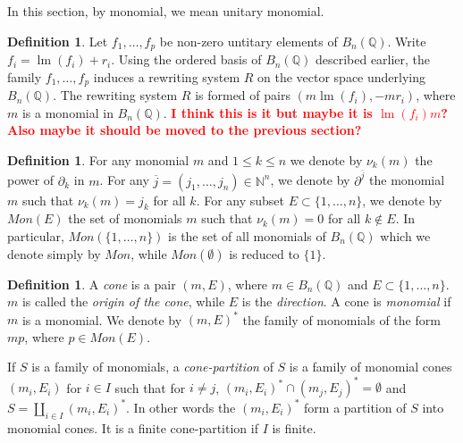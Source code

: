 \documentclass[10pt]{easychair}
\theoremstyle{definition}
\newtheorem{definition}[theorem]{Definition}
\newtheorem{example}[theorem]{Example}
\newcommand\todo[1]{{\bf\textcolor{red}{#1}}}
\DeclareMathOperator{\lm}{lm}
\newcommand\Q{\mathbb{Q}}
\newcommand\Weyl[1]{B_{#1}(\Q)}
\begin{document}
In this section, by monomial, we mean unitary monomial.



\begin{definition}
  Let $f_1,\ldots,f_p$ be non-zero untitary elements of $\Weyl n$.
  Write $f_i = \lm (f_i) + r_i$.
  Using the ordered basis of $\Weyl n$ described earlier,
  the family $f_1,\ldots,f_p$ induces a rewriting system $R$ on the vector
  space underlying $\Weyl n$.
  The rewriting system $R$ is formed of pairs $(m \lm(f_i), - m  r_i)$,
  where $m$ is a monomial in $\Weyl n$.
  \todo{I think this is it but maybe it is $\lm(f_i) m$?
    Also maybe it should be moved to the previous section?}
  
\end{definition}

\begin{definition}
  For any monomial $m$ and $1 \leq k \leq n$ we denote by $\nu_k(m)$
  the power of $\partial_k$ in $m$.
  For any $\overline j =(j_1,\ldots,j_n) \in \mathbb N^n$, we denote by $\partial^{\overline j}$
  the monomial $m$ such that $\nu_k(m) = j_k$ for all $k$. For any subset
  $E \subset \{1,\ldots,n\}$, we denote by $Mon(E)$ the set of monomials $m$ such that
  $\nu_k(m) = 0$ for all $k \notin E$. In particular, $Mon(\{1,\ldots,n\})$ is the set of
  all monomials of $\Weyl n$ which we denote simply by $Mon$, while $Mon(\emptyset)$ is
  reduced to $\{1\}$. 
\end{definition}

\begin{definition}
  A \emph{cone} is a pair $(m,E)$, where $m \in \Weyl n$ and $E \subset \{1,\ldots,n\}$.
  $m$ is called the \emph{origin of the cone}, while $E$
  is the \emph{direction}. A cone is \emph{monomial} if $m$ is a monomial.
  We denote by $(m,E)^*$ the family of monomials of the form $mp$,
  where $p \in Mon(E)$.

  If $S$ is a family of monomials, a \emph{cone-partition} of $S$ is a family
  of monomial cones $(m_i,E_i)$ for $i \in I$ such that for $i \neq j$,
  $(m_i,E_i)^* \cap (m_j,E_j)^* = \emptyset$ and $S = \coprod_{i \in I} (m_i,E_i)^*$.
  In other words the $(m_i,E_i)^*$ form a partition of $S$ into monomial cones.
  It is a finite cone-partition if $I$ is finite.
\end{definition}
\end{document}
